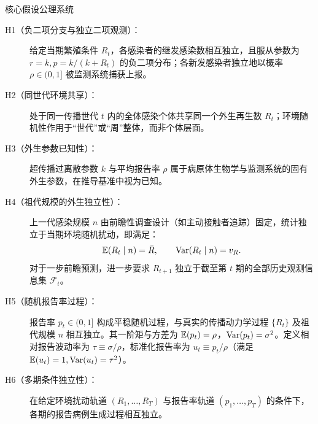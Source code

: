 \begin{theorembox}{核心假设公理系统}
\begin{description}
  \item[H1（负二项分支与独立二项观测）：] 给定当期繁殖条件 $R_t$，各感染者的继发感染数相互独立，且服从参数为 $r=k, p=k/(k+R_t)$ 的负二项分布；各新发感染者独立地以概率 $\rho \in (0, 1]$ 被监测系统捕获上报。
  \item[H2（同世代环境共享）：] 处于同一传播世代 $t$ 内的全体感染个体共享同一个外生再生数 $R_t$；环境随机性作用于“世代”或“周”整体，而非个体层面。
  \item[H3（外生参数已知性）：] 超传播过离散参数 $k$ 与平均报告率 $\rho$ 属于病原体生物学与监测系统的固有外生参数，在推导基准中视为已知。
  \item[H4（祖代规模的外生独立性）：] 上一代感染规模 $n$ 由前瞻性调查设计（如主动接触者追踪）固定，统计独立于当期环境随机扰动，即满足：
  \begin{equation}
    \mathbb{E}(R_t \mid n) = \bar{R}, \qquad \mathrm{Var}(R_t \mid n) = v_R.
  \end{equation}
  对于一步前瞻预测，进一步要求 $R_{t+1}$ 独立于截至第 $t$ 期的全部历史观测信息集 $\mathcal{F}_t$。
  \item[H5（随机报告率过程）：] 报告率 $p_t \in (0, 1]$ 构成平稳随机过程，与真实的传播动力学过程 $\{R_t\}$ 及祖代规模 $n$ 相互独立。其一阶矩与方差为 $\mathbb{E}(p_t) = \rho$，$\mathrm{Var}(p_t) = \sigma^2$。定义相对报告波动率为 $\tau \equiv \sigma / \rho$，标准化报告率为 $u_t \equiv p_t / \rho$（满足 $\mathbb{E}(u_t) = 1, \mathrm{Var}(u_t) = \tau^2$）。
  \item[H6（多期条件独立性）：] 在给定环境扰动轨道 $(R_1, \dots, R_T)$ 与报告率轨道 $(p_1, \dots, p_T)$ 的条件下，各期的报告病例生成过程相互独立。
\end{description}
\end{theorembox}
